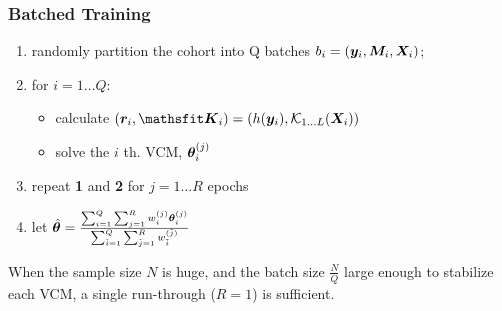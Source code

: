 \documentclass{beamer}
\begin{document}
\begin{frame}\frametitle{Batched Training}
  \begin{enumerate}
  \item randomly partition the cohort into Q batches $b_i = ({\bm{y}}_i, {\bm{M}}_i, {\bm{X}}_i)$;
  \item for $i = 1 \dots Q$:
    \begin{itemize}
    \item calculate $(\vr_i, \tK_i) = (h(\vy_i), \mathcal{K}_{1 \dots L}(\mX_i))$
    \item solve the $i$ th. VCM, ${\bm{\theta}}_i^{(j)}$
    \end{itemize}
  \item repeat \textbf{1} and \textbf{2} for $j=1 \dots R$ epochs
  \item let $\hat{{\bm{\theta}}} = \frac
    {\sum_{i=1}^Q\sum_{j=1}^R w_i^{(j)}{\bm{\theta}}_i^{(j)}}
    {\sum_{\tilde{i}=1}^Q \sum_{\tilde{j}=1}^R w_{\tilde{i}}^{(\tilde{j})}}$
  \end{enumerate}
  When the sample size $N$ is huge, and the batch size $\frac{N}{Q}$ large enough to
  stabilize each VCM, a single run-through ($R=1$) is sufficient.
\end{frame}
\end{document}
